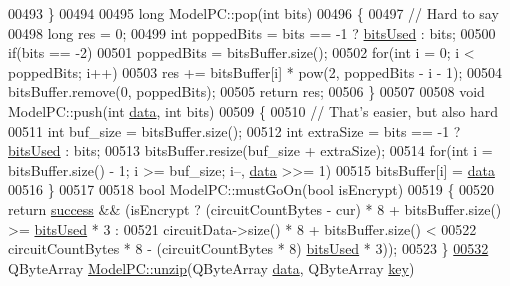 \begin{DoxyCode}
00493 \}
00494 
00495 \textcolor{keywordtype}{long} ModelPC::pop(\textcolor{keywordtype}{int} bits)
00496 \{
00497     \textcolor{comment}{// Hard to say}
00498     \textcolor{keywordtype}{long} res = 0;
00499     \textcolor{keywordtype}{int} poppedBits = bits == -1 ? \mbox{\hyperlink{class_model_p_c_a655deb6a8afa94c7f4aadb3056989038}{bitsUsed}} : bits;
00500     \textcolor{keywordflow}{if}(bits == -2)
00501         poppedBits = bitsBuffer.size();
00502     \textcolor{keywordflow}{for}(\textcolor{keywordtype}{int} i = 0; i < poppedBits; i++)
00503         res += bitsBuffer[i] * pow(2, poppedBits - i - 1);
00504     bitsBuffer.remove(0, poppedBits);
00505     \textcolor{keywordflow}{return} res;
00506 \}
00507 
00508 \textcolor{keywordtype}{void} ModelPC::push(\textcolor{keywordtype}{int} \mbox{\hyperlink{namespace_errors_dict_setup_af570460846fb9f0c91abd308a095dcdc}{data}}, \textcolor{keywordtype}{int} bits)
00509 \{
00510     \textcolor{comment}{// That's easier, but also hard}
00511     \textcolor{keywordtype}{int} buf\_size = bitsBuffer.size();
00512     \textcolor{keywordtype}{int} extraSize = bits == -1 ? \mbox{\hyperlink{class_model_p_c_a655deb6a8afa94c7f4aadb3056989038}{bitsUsed}} : bits;
00513     bitsBuffer.resize(buf\_size + extraSize);
00514     \textcolor{keywordflow}{for}(\textcolor{keywordtype}{int} i = bitsBuffer.size() - 1; i >= buf\_size; i--, \mbox{\hyperlink{namespace_errors_dict_setup_af570460846fb9f0c91abd308a095dcdc}{data}} >>= 1)
00515         bitsBuffer[i] = \mbox{\hyperlink{namespace_errors_dict_setup_af570460846fb9f0c91abd308a095dcdc}{data}} %
00516 \}
00517 
00518 \textcolor{keywordtype}{bool} ModelPC::mustGoOn(\textcolor{keywordtype}{bool} isEncrypt)
00519 \{
00520     \textcolor{keywordflow}{return} \mbox{\hyperlink{class_model_p_c_a945ffbbc44a832b953c191debd448f4c}{success}} && (isEncrypt ? (circuitCountBytes - cur) * 8 + bitsBuffer.size() >= 
      \mbox{\hyperlink{class_model_p_c_a655deb6a8afa94c7f4aadb3056989038}{bitsUsed}} * 3 :
00521                                    circuitData->size() * 8 + bitsBuffer.size() <
00522                                    circuitCountBytes * 8 - (circuitCountBytes * 8)%
      \mbox{\hyperlink{class_model_p_c_a655deb6a8afa94c7f4aadb3056989038}{bitsUsed}} * 3));
00523 \}
\mbox{\hyperlink{class_model_p_c_a6da88f166785a49f73b22c169f956fd0}{00532}} QByteArray \mbox{\hyperlink{class_model_p_c_a6da88f166785a49f73b22c169f956fd0}{ModelPC::unzip}}(QByteArray \mbox{\hyperlink{namespace_errors_dict_setup_af570460846fb9f0c91abd308a095dcdc}{data}}, QByteArray \mbox{\hyperlink{namespace_errors_dict_setup_a09c268098d09ffb8e5504f30fa6d5dd9}{key}})

\end{DoxyCode}
